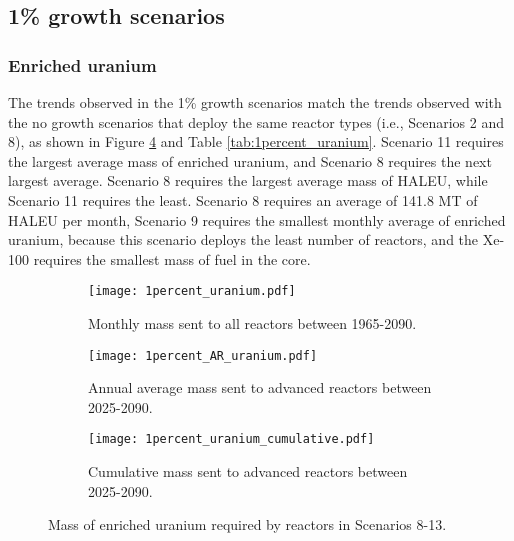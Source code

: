 \subsection{1\% growth scenarios}
\subsubsection{Enriched uranium}
The trends observed in the 1\% growth scenarios match the trends 
observed with the no growth scenarios that deploy the same reactor 
types (i.e., Scenarios 2 and 8), as shown in 
Figure \ref{fig:1percent_uranium} and Table \ref{tab:1percent_uranium}. 
Scenario 11 requires the largest average mass of enriched uranium, and Scenario
8 requires the next largest average. Scenario 8 requires the largest 
average mass of \gls{HALEU}, while Scenario 11 requires the least. Scenario 
8 requires an average of 141.8 MT of \gls{HALEU} per month, Scenario 
9 requires the 
smallest monthly average of enriched uranium, because this scenario 
deploys the least number of reactors, and the Xe-100 requires the smallest 
mass of fuel in the core. 

\begin{figure}[h!]
    \centering
    \begin{subfigure}[b]{0.45\textwidth}
        \centering
        \texttt{[image: 1percent\_uranium.pdf]}
        \caption{Monthly mass sent to all reactors between 1965-2090.}
        \label{fig:1percent_all_uranium}
    \end{subfigure}
    \hfill
    \begin{subfigure}[b]{0.45\textwidth}
        \centering
        \texttt{[image: 1percent\_AR\_uranium.pdf]}
        \caption{Annual average mass sent to 
        advanced reactors between 2025-2090.}
        \label{fig:1percent_AR_uranium}
    \end{subfigure}
    \begin{subfigure}[b]{0.45\textwidth}
        \centering
        \texttt{[image: 1percent\_uranium\_cumulative.pdf]}
        \caption{Cumulative mass sent to advanced reactors 
        between 2025-2090.}
        \label{fig:1percent_uranium_cumulative}
    \end{subfigure}
       \caption{Mass of enriched uranium required by reactors
        in Scenarios 8-13.}
       \label{fig:1percent_uranium}
\end{figure}

